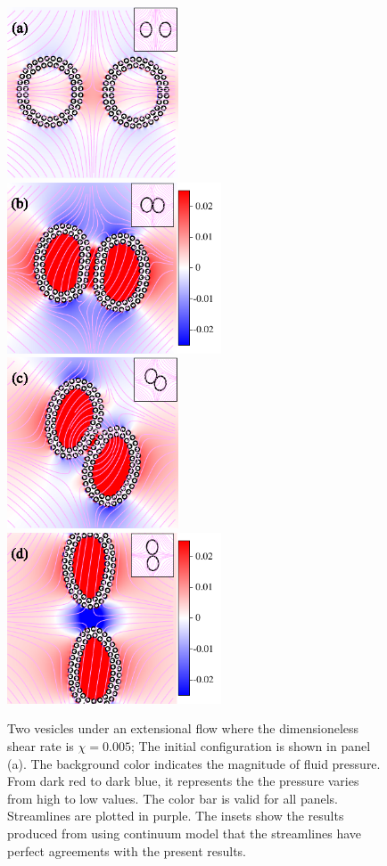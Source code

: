 \documentclass[lineno]{jfm}
\begin{document}
\begin{figure}
\centering
\includegraphics[height=2in]{N116_ext_0.pdf}
\includegraphics[height=2in]{N116_ext_2000.pdf}\\
\includegraphics[height=2in]{N116_ext_4000.pdf}
\includegraphics[height=2in]{N116_ext_6500.pdf}
  \caption{Two vesicles under an extensional flow where the dimensioneless shear rate is $\chi=0.005$; The initial configuration is shown in panel (a). The background color indicates the magnitude of fluid pressure. From dark red to dark blue, it represents the the pressure varies from high to low values. The color bar is valid for all panels. Streamlines are plotted in purple. The insets show the results produced from using continuum model that the streamlines have perfect agreements with the present results.
  }
    \label{figure12}
\end{figure}
\end{document}
